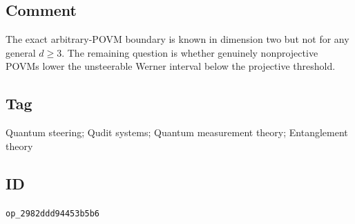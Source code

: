 \subsection*{Comment}

The exact arbitrary-POVM boundary is known in dimension two but not for any
general $d\geq3$.  The remaining question is whether genuinely
nonprojective POVMs lower the unsteerable Werner interval below the
projective threshold.

\subsection*{Tag}

Quantum steering; Qudit systems; Quantum measurement theory; Entanglement theory

\subsection*{ID}

\texttt{op\_2982ddd94453b5b6}

